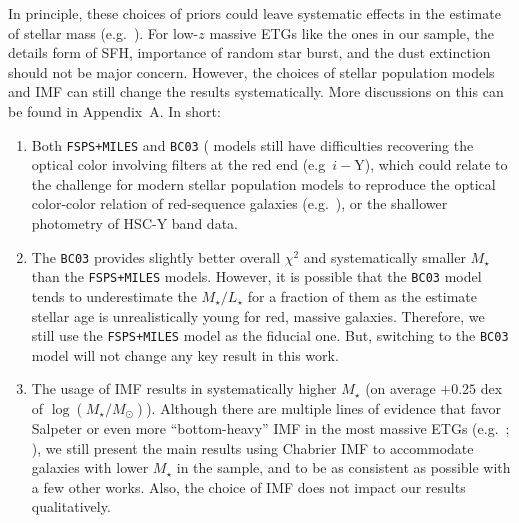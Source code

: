 \documentclass{emulateapj}
\def\mstar{{$M_{\star}$}}
\def\logms{{$\log (M_{\star}/M_{\odot})$}}
\def\m2l{{$M_{\star}/L_{\star}$}}
\begin{document}
\begin{CJK*}{UTF8}{gbsn}
    In principle, these choices of priors could leave systematic effects in 
    the estimate of stellar mass (e.g.\ \citealt{Bernardi2016b}). 
    For low-$z$ massive ETGs like the ones in our sample, the details form of 
    SFH, importance of random star burst, and the dust extinction should not be 
    major concern.  
    However, the choices of stellar population models and IMF can still 
    change the results systematically. 
    More discussions on this can be found in Appendix~A. 
    In short: 
    \begin{enumerate}
        \item Both \texttt{FSPS+MILES} and \texttt{BC03} (\citealt{BC03} models 
            still have difficulties recovering the optical color involving filters 
            at the red end (e.g~$i-$Y), which could relate to the challenge for 
            modern stellar population models to reproduce the optical color-color 
            relation of red-sequence galaxies (e.g.\ \citealt{MIUSCAT2}), or the 
            shallower photometry of HSC-Y band data. 
        \item The \texttt{BC03} provides slightly better overall ${\chi}^2$ and 
            systematically smaller \mstar{} than the \texttt{FSPS+MILES} models.  
            However, it is possible that the \texttt{BC03} model tends to 
            underestimate the \m2l{} for a fraction of them as the estimate 
            stellar age is unrealistically young for red, massive galaxies.  
            Therefore, we still use the \texttt{FSPS+MILES} model as the fiducial 
            one.  But, switching to the \texttt{BC03} model will not change any 
            key result in this work. 
        \item The usage of \citet{Salpeter1955} IMF results in systematically 
            higher \mstar{} (on average $+0.25$ dex of \logms{}).  
            Although there are multiple lines of evidence that favor Salpeter 
            or even more ``bottom-heavy'' IMF in the most massive ETGs 
            (e.g.\ \citealt{Conroy2012}; \citealt{Cappellari2012}), we still 
            present the main results using Chabrier IMF to accommodate galaxies 
            with lower \mstar{} in the sample, and to be as consistent as possible 
            with a few other works.  
            Also, the choice of IMF does not impact our results qualitatively.     
    \end{enumerate}
    

\end{CJK*}
\end{document}
